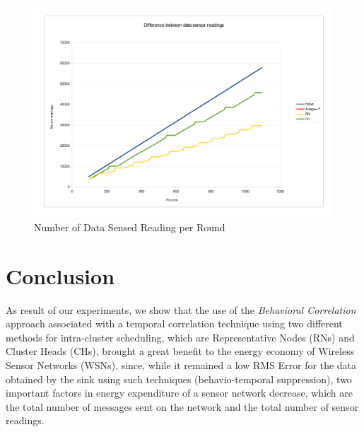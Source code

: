 \documentclass[conference]{IEEEtran}
\begin{document}
\begin{figure}[!htb]
\centering
	\includegraphics[scale=0.085]{graf_SREAD_.png}
    \caption{Number of Data Sensed Reading per Round}
    \label{fig:sens-reading}
\end{figure}


\section{Conclusion}
\label{conclusion}

As result of our experiments, we show that the use of the \textit{Behavioral
Correlation} approach associated with a temporal correlation technique using two
different methods for intra-cluster scheduling, which are Representative Nodes
(RNs) and Cluster Heads (CHs), brought a great benefit to the energy economy of
Wireless Sensor Networks (WSNs), since, while it remained a low RMS Error for
the data obtained by the sink using such techniques (behavio-temporal
suppression), two important factors in energy expenditure of a sensor network
decrease, which are the total number of messages sent on the network and the
total number of sensor readings.






  
\end{document}

